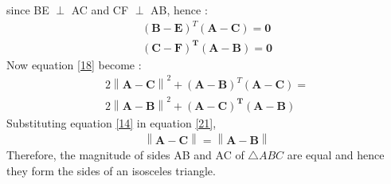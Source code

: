 \documentclass[journal,12pt,twocolumn]{IEEEtran}
\let\vec\mathbf
\newcommand{\norm}[1]{\left\lVert#1\right\rVert}
\begin{document}
since BE $\perp$ AC and CF $\perp$ AB, hence :
\begin{align}
 \left ( \vec{   B - E }\right)^T \left( \vec{A - C} \right) = \vec{0} \\
  \vec{\left (  C - F\right)^{T} \left( A - B \right)} = \vec{0}
\end{align}
Now equation \ref{18} become :
 \begin{multline}
2\norm{\vec{A - C}}^2 + \left ( \vec{  A - B  }\right)^T \left( \vec{A - C} \right)    =  \\ 2 \norm{\vec{A - B}}^2 + \vec{\left ( A - C \right)^{T} \left( A - B \right)} \label{21}
 \end{multline} 
  Substituting equation \ref{14} in equation \ref{21},
    \begin{align}
  \norm{\vec{A - C} } = \norm {\vec{A - B}}
  \end{align}
  Therefore,  the magnitude of sides AB and AC of $\triangle ABC$ are equal and hence they form the sides of an isosceles triangle.
\end{document}
